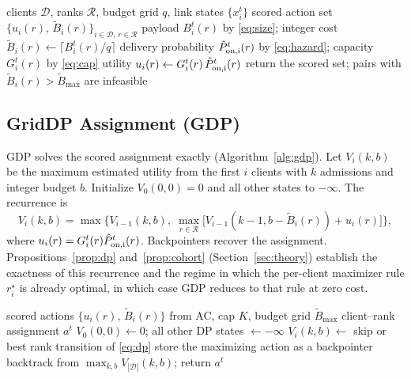 \documentclass[a4paper,fleqn]{cas-dc}
\begin{document}
\begin{algorithm}[t]
\caption{Action Construction (AC)}
\label{alg:ac}
\begin{algorithmic}[1]
\REQUIRE clients $\mathcal D$, ranks $\mathcal R$, budget grid $q$, link states $\{x_i^t\}$
\ENSURE scored action set $\{u_i(r),\,\widetilde B_i(r)\}_{i\in\mathcal D,\,r\in\mathcal R}$
  \STATE payload $B_i^t(r)$ by \eqref{eq:size}; integer cost $\widetilde B_i(r)\gets\lceil B_i^t(r)/q\rceil$
  \STATE delivery probability $\hat P_{\rm on,i}^t(r)$ by \eqref{eq:hazard}; capacity $G_i^t(r)$ by \eqref{eq:cap}
  \STATE utility $u_i(r)\gets G_i^t(r)\,\hat P_{\rm on,i}^t(r)$
\ENDFOR
\STATE return the scored set; pairs with $\widetilde B_i(r)>\widetilde B_{\max}$ are infeasible
\end{algorithmic}
\end{algorithm}

\subsection{GridDP Assignment (GDP)}
\label{sec:gdp}
GDP solves the scored assignment exactly (Algorithm~\ref{alg:gdp}). Let $V_i(k,b)$ be the maximum estimated utility from the first $i$ clients with $k$ admissions and integer budget $b$. Initialize $V_0(0,0)=0$ and all other states to $-\infty$. The recurrence is
\begin{equation}
V_i(k,b)=\max\Big\{V_{i-1}(k,b),\;\max_{r\in\mathcal R}\big[V_{i-1}(k-1,b-\widetilde B_i(r))+u_i(r)\big]\Big\},
\label{eq:dp}
\end{equation}
where $u_i(r)=G_i^t(r)\hat P_{\rm on,i}^t(r)$. Backpointers recover the assignment. Propositions~\ref{prop:dp} and~\ref{prop:cohort} (Section~\ref{sec:theory}) establish the exactness of this recurrence and the regime in which the per-client maximizer rule $r_i^\star$ is already optimal, in which case GDP reduces to that rule at zero cost.

\begin{algorithm}[t]
\caption{GridDP Assignment (GDP)}
\label{alg:gdp}
\begin{algorithmic}[1]
\REQUIRE scored actions $\{u_i(r),\,\widetilde B_i(r)\}$ from AC, cap $K$, budget grid $\widetilde B_{\max}$
\ENSURE client--rank assignment $a^t$
\STATE $V_0(0,0)\gets 0$; all other DP states $\gets -\infty$
    \STATE $V_i(k,b)\gets$ skip or best rank transition of \eqref{eq:dp}
    \STATE store the maximizing action as a backpointer
  \ENDFOR
\ENDFOR
\STATE backtrack from $\max_{k,b}V_{|\mathcal D|}(k,b)$; return $a^t$
\end{algorithmic}
\end{algorithm}
\end{document}
